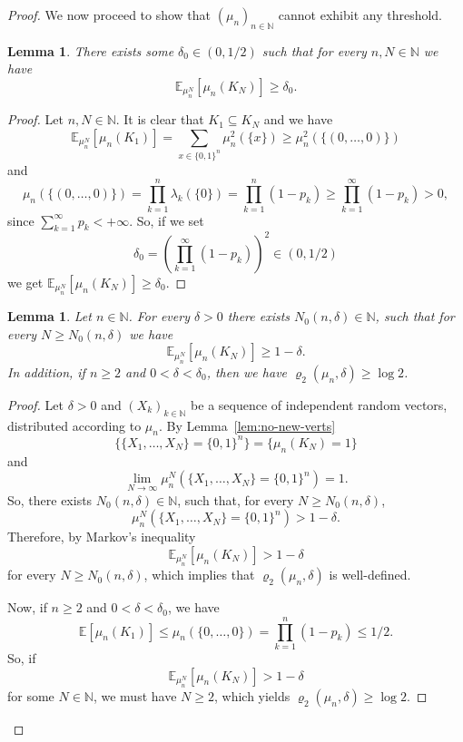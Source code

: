 \documentclass[11pt,a4paper]{article} %
\newtheorem{lemma}[theorem]{Lemma}
\theoremstyle{definition}
\theoremstyle{remark}
\newcommand{\1}{\mathds{1}}
\begin{document}
\begin{proof}
We now proceed to show that  $(\mu_n)_{n \in \mathbb{N}}$  cannot exhibit any  threshold.

        \begin{lemma}\label{lem:counter-lower}
        There exists some $\delta_0 \in (0, 1/2)$ such that for every $n,N \in \mathbb{N}$ we have $$\mathbb{E}_{\mu_n^N}[\mu_n(K_N)] \geq \delta_0.$$ 
            
        \end{lemma}
        
\begin{proof}
Let $n,N \in \mathbb{N}$. It is clear that $K_1 \subseteq K_N$ and we have 
$$ \mathbb{E}_{\mu_n^N}[\mu_n(K_1)] = \sum\limits_{x \in \{0,1\}^n } \mu^2_n(\{x\}) \geq \mu^2_n(\{(0,\ldots,0)\})$$ and $$\mu_n(\{(0,\ldots,0)\})=\prod\limits_{k=1}^{n} \lambda_k(\{0\})= \prod\limits_{k=1}^{n}(1-p_k) \geq \prod_{k=1}^{\infty}(1-p_k)>0,$$ since $\sum_{k=1}^{\infty}p_k < +\infty$. So, if we set $$\delta_0=\left(\prod\limits_{k=1}^{\infty}(1-p_k)\right)^2 \in (0,1/2)$$ we get $\mathbb{E}_{\mu_n^N}[\mu_n(K_N)] \geq \delta_0$. \end{proof}

    \begin{lemma}\label{lem:counter-upper}Let  $n \in \mathbb{N}$. For every $\delta>0$ there exists $N_0(n,\delta) \in \mathbb{N}$, such that for every $N \geq N_0(n,\delta)$ we have $$\mathbb{E}_{\mu_n^N}[\mu_n(K_N)] \geq 1-\delta.$$ In addition, if $n \geq 2$ and $0<\delta<\delta_0$, then we have $ \varrho_2(\mu_n,\delta) \geq \log 2 $.
        
    \end{lemma}

    \begin{proof}
        Let $\delta>0$ and $(X_k)_{k \in \mathbb{N}}$ be a sequence of independent random vectors, distributed according to $\mu_n$. By Lemma~\ref{lem:no-new-verts} $$\{ \{X_1,\ldots,X_N\}=\{0,1\}^n\}=\{\mu_n(K_N)=1\}$$ and $$\lim\limits_{N \to \infty} \mu_n^N\left(\{X_1,\ldots,X_N\}=\{0,1\}^n\right)=1.$$ So, there exists $N_0(n,\delta) \in \mathbb{N}$, such that, for every $N \geq N_0(n,\delta)$, $$\mu_n^N\left(\{X_1,\ldots,X_N\}=\{0,1\}^n\right) >1-\delta.$$ Therefore, by Markov's inequality $$\mathbb{E}_{\mu_n^N}[\mu_n(K_N)] >1-\delta$$ for every $N \geq N_0(n,\delta)$, which implies that $\varrho_2(\mu_n,\delta)$ is well-defined.

         Now, if $n \geq 2$ and $0<\delta<\delta_0$, we have
$$\mathbb{E}[\mu_n(K_1)] \leq \mu_n(\{0,\ldots,0\})= \prod\limits_{k=1}^n (1-p_k) \leq1/2.$$ So, if $$\mathbb{E}_{\mu_n^N}[\mu_n(K_N)]>1-\delta$$ for some $N \in \mathbb{N}$, we must have $N \geq 2$, which yields $\varrho_2(\mu_n,\delta) \geq \log 2$.
\end{proof}


\end{proof}
\end{document}

